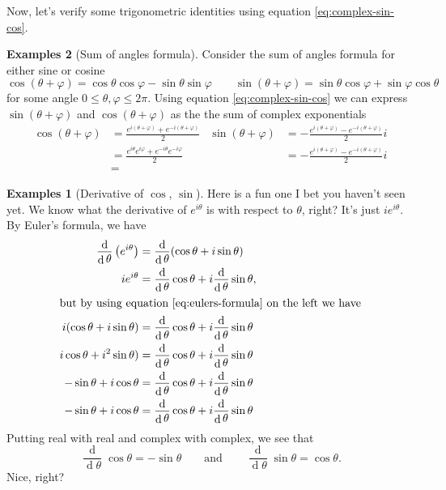 \documentclass{amsart}
\theoremstyle{plain}
\theoremstyle{definition}
\newtheorem{example}{Examples}
\DeclareMathOperator{\diff}{d}
\begin{document}
Now, let's verify some trigonometric identities using equation
\eqref{eq:complex-sin-cos}.
\begin{example}[Sum of angles formula]
Consider the sum of angles formula  for either sine or cosine
\begin{equation}
  \label{eq:sum-of-angles}
\cos(\theta+\varphi)=\cos\theta\cos\varphi-\sin\theta\sin\varphi\qquad
\sin(\theta+\varphi)=\sin\theta\cos\varphi+\sin\varphi\cos\theta
\end{equation}
for some angle $0\leq\theta,\varphi\leq 2\pi$. Using equation
\eqref{eq:complex-sin-cos} we can express $\sin(\theta+\varphi)$ and
$\cos(\theta+\varphi)$ as the the sum of complex exponentials
\begingroups
\allowdisplaybreaks
\begin{align*}
\cos(\theta+\varphi)&=\frac{e^{i(\theta+\varphi)}+e^{-i(\theta+\varphi)}}{2}&
\sin(\theta+\varphi)&=-\frac{e^{i(\theta+\varphi)}-e^{-i(\theta+\varphi)}}{2}i\\
&=\frac{e^{i\theta}e^{i\varphi}+e^{-i\theta}e^{-i\varphi}}{2}&
&=-\frac{e^{i(\theta+\varphi)}-e^{-i(\theta+\varphi)}}{2}i\\
&=
\end{align*}
\endgroup

\begin{example}[Derivative of $\cos$, $\sin$]
Here is a fun one I bet you haven't seen yet. We know what the derivative
of $e^{i\theta}$ is with respect to $\theta$, right? It's just
$ie^{i\theta}$. By Euler's formula, we have
\begin{align*}
\frac{\diff}{\diff\theta}\left(e^{i\theta}\right)
&=\frac{\diff}{\diff\theta}(\cos\theta+i\sin\theta)\\
ie^{i\theta}&=\frac{\diff}{\diff\theta}\cos\theta
+i\frac{\diff}{\diff\theta}\sin\theta,\\
\intertext{but by using equation \eqref{eq:eulers-formula} on the left we have}
i(\cos\theta+i\sin\theta)&=\frac{\diff}{\diff\theta}\cos\theta
+i\frac{\diff}{\diff\theta}\sin\theta\\
i\cos\theta+i^2\sin\theta)&=\frac{\diff}{\diff\theta}\cos\theta
+i\frac{\diff}{\diff\theta}\sin\theta\\
-\sin\theta+i\cos\theta&=\frac{\diff}{\diff\theta}\cos\theta
+i\frac{\diff}{\diff\theta}\sin\theta\\
-\sin\theta+i\cos\theta&=\frac{\diff}{\diff\theta}\cos\theta
+i\frac{\diff}{\diff\theta}\sin\theta
\end{align*}
Putting real with real and complex with complex, we see that
\[
\frac{\diff}{\diff\theta}\cos\theta=-\sin\theta\qquad\text{and}\qquad
\frac{\diff}{\diff\theta}\sin\theta=\cos\theta.
\]
Nice, right?
\end{example}
\end{example}
\end{document}
